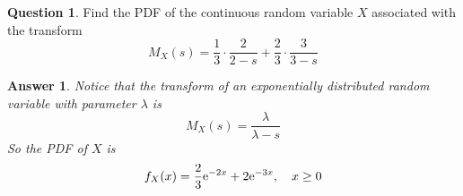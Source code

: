 \documentclass[utf8]{article}
\theoremstyle{definition}%
\newtheorem{question}{Question} %
\theoremstyle{plain}%
\newtheorem{answer}{Answer} %
\begin{document}
\begin{question}
    Find the PDF of the continuous random variable $X$  associated with the transform
    \begin{equation}
        M_X(s) = \frac{1}{3} \cdot \frac{2}{2 - s} + \frac{2}{3} \cdot \frac{3}{3 - s}
    \end{equation}
\end{question}
\begin{answer}
    Notice that the transform of an exponentially distributed random variable with parameter $\lambda$ is
    \begin{equation}
        M_X(s) = \frac{\lambda}{\lambda - s}
    \end{equation}
    So the PDF of $X$ is
    \begin{equation}
        f_X(x) = \frac{2}{3} \mathrm{e}^{-2x} + 2 \mathrm{e}^{-3x}, \quad x \geq 0
    \end{equation}
\end{answer}
\end{document}
